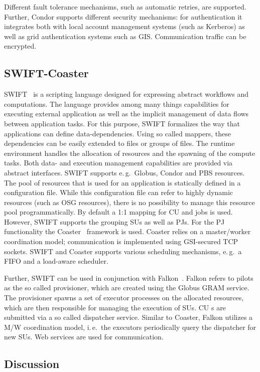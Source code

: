 \documentclass[conference,final]{IEEEtran}
\newcommand{\cu}{CU\xspace}
\newcommand{\upp}{\vspace*{-0.5em}}
\begin{document}
Different fault tolerance mechanisms, such as automatic retries, are
supported.  Further, Condor supports different security mechanisms:
for authentication it integrates both with local account management
systems (such as Kerberos) as well as grid authentication systems such
as GIS. Communication traffic can be encrypted.


\upp
\subsection{SWIFT-Coaster\upp\upp}

SWIFT~\cite{Wilde2011} is a scripting language designed for expressing abstract
workflows and computations. The language provides among many things capabilities
for executing external application as well as the implicit management of data
flows between application tasks. For this purpose, SWIFT formalizes the way that
applications can define data-dependencies. Using so called mappers, these
dependencies can be easily extended to files or groups of files. The runtime
environment handles the allocation of resources and the spawning of the compute
tasks. Both data- and execution management capabilities are provided via
abstract interfaces. SWIFT supports e.\,g.\ Globus, Condor and PBS resources.
The pool of resources that is used for an application is statically defined in a
configuration file. While this configuration file can refer to highly dynamic
resources (such as OSG resources), there is no possibility to manage this
resource pool programmatically. By default a 1:1 mapping for \cu and jobs is
used. However, SWIFT supports the grouping SUs as well as PJs. For the PJ
functionality the Coaster~\cite{coasters} framework is used. Coaster relies on a
master/worker coordination model; communication is implemented using GSI-secured
TCP sockets. SWIFT and Coaster supports various scheduling mechanisms, e.\,g.\ 
a FIFO and a load-aware scheduler. 

Further, SWIFT can be used in conjunction with Falkon~\cite{1362680}. Falkon
refers to pilots as the so called provisioner, which are created using the
Globus GRAM service. The provisioner spawns a set of executor processes on the
allocated resources, which are then responsible for managing the execution of
SUs. \cu s are submitted via a so called dispatcher service. Similar to Coaster,
Falkon utilizes a M/W coordination model, i.\,e.\ the executors periodically
query the dispatcher for new SUs. Web services are used for communication.


\subsection{Discussion}
\end{document}
